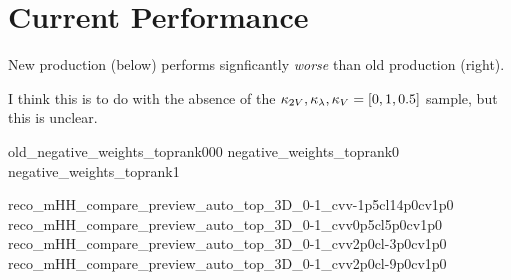 \section{Current Performance}
{ \tiny
    New production (below) performs signficantly \textit{worse} than old production (right).
    \vspace{3mm}

    I think this is to do with the absence of the $\kappa_{2V},\kappa_{\lambda},\kappa_{V} = [0, 1, 0.5]$ sample, but this is unclear.
}
{old_negative_weights_toprank000}
{negative_weights_toprank0}
{negative_weights_toprank1}

{reco_mHH_compare_preview_auto_top_3D_0-1_cvv-1p5cl14p0cv1p0}
{reco_mHH_compare_preview_auto_top_3D_0-1_cvv0p5cl5p0cv1p0}
{reco_mHH_compare_preview_auto_top_3D_0-1_cvv2p0cl-3p0cv1p0}
{reco_mHH_compare_preview_auto_top_3D_0-1_cvv2p0cl-9p0cv1p0}
